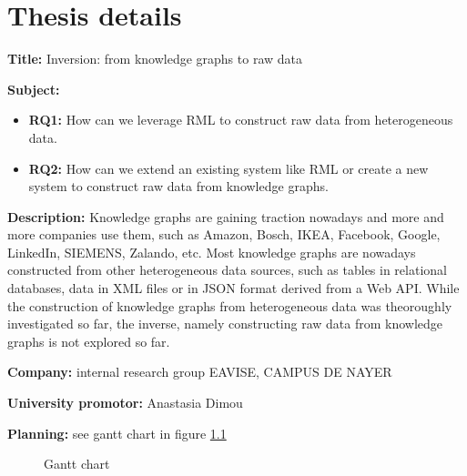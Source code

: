 
\chapter{Thesis details}

\textbf{Title: } Inversion: from knowledge graphs to raw data

\textbf{Subject: } 
\begin{itemize}
	\item \textbf{RQ1: } How can we leverage RML to construct raw data from heterogeneous data.
	\item \textbf{RQ2: } How can we extend an existing system like RML or create a new system to construct raw data from knowledge graphs.
\end{itemize}

\textbf{Description: } Knowledge graphs are gaining traction nowadays and more and more companies use them, such as Amazon, Bosch, IKEA, Facebook, Google, LinkedIn, SIEMENS, Zalando, etc. Most knowledge graphs are nowadays constructed from other heterogeneous data sources, such as tables in relational databases, data in XML files or in JSON format derived from a Web API. While the construction of knowledge graphs from heterogeneous data was theoroughly investigated so far, the inverse, namely constructing raw data from knowledge graphs is not explored so far.

\textbf{Company: } internal research group EAVISE, CAMPUS DE NAYER

\textbf{University promotor: } Anastasia Dimou

\textbf{Planning: } see gantt chart in figure \ref{fig:gantt_chart}



\begin{figure}[htbp]
	\caption{Gantt chart}
	\label{fig:gantt_chart}
  \end{figure}

